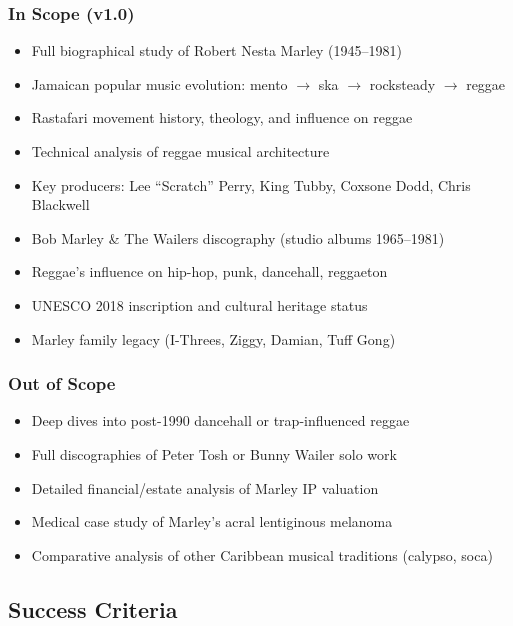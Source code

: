 \documentclass[11pt,letterpaper]{article}
\begin{document}
\subsubsection{In Scope (v1.0)}
\begin{itemize}[noitemsep]
  \item Full biographical study of Robert Nesta Marley (1945--1981)
  \item Jamaican popular music evolution: mento $\rightarrow$ ska $\rightarrow$ rocksteady $\rightarrow$ reggae
  \item Rastafari movement history, theology, and influence on reggae
  \item Technical analysis of reggae musical architecture
  \item Key producers: Lee ``Scratch'' Perry, King Tubby, Coxsone Dodd, Chris Blackwell
  \item Bob Marley \& The Wailers discography (studio albums 1965--1981)
  \item Reggae's influence on hip-hop, punk, dancehall, reggaeton
  \item UNESCO 2018 inscription and cultural heritage status
  \item Marley family legacy (I-Threes, Ziggy, Damian, Tuff Gong)
\end{itemize}

\subsubsection{Out of Scope}
\begin{itemize}[noitemsep]
  \item Deep dives into post-1990 dancehall or trap-influenced reggae
  \item Full discographies of Peter Tosh or Bunny Wailer solo work
  \item Detailed financial/estate analysis of Marley IP valuation
  \item Medical case study of Marley's acral lentiginous melanoma
  \item Comparative analysis of other Caribbean musical traditions (calypso, soca)
\end{itemize}

\subsection{Success Criteria}
\end{document}
